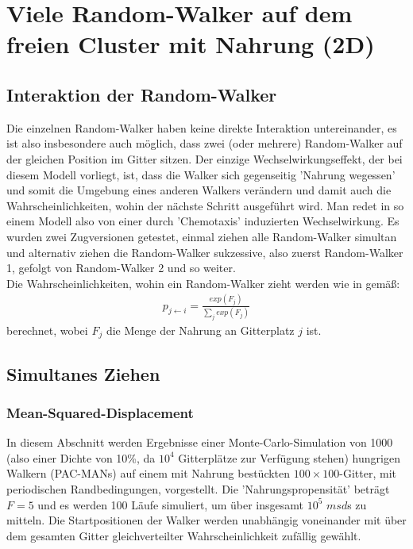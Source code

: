 \documentclass[a4paper, 12pt]{report}
\begin{document}
\chapter{Viele Random-Walker auf dem freien Cluster mit Nahrung (2D)}
\section{Interaktion der Random-Walker}
Die einzelnen Random-Walker haben keine direkte Interaktion untereinander, es ist also insbesondere auch möglich, dass zwei (oder mehrere) Random-Walker auf der gleichen Position im Gitter sitzen. Der einzige Wechselwirkungseffekt, der bei diesem Modell vorliegt, ist, dass die Walker sich gegenseitig 'Nahrung wegessen' und somit die Umgebung eines anderen Walkers verändern und damit auch die Wahrscheinlichkeiten, wohin der nächste Schritt ausgeführt wird. Man redet in so einem Modell also von einer durch 'Chemotaxis' induzierten Wechselwirkung. Es wurden zwei Zugversionen getestet, einmal ziehen alle Random-Walker simultan und alternativ ziehen die Random-Walker sukzessive, also zuerst Random-Walker 1, gefolgt von Random-Walker 2 und so weiter. \\
\noindent Die Wahrscheinlichkeiten, wohin ein Random-Walker zieht werden wie in \cite{doi:10.1063/1.4999485} gemäß:
\begin{align}
p_{j \leftarrow i} = \frac{exp({F_j})}{\sum_j exp({F_j})}
\label{Wkeiten}
\end{align}
berechnet, wobei $F_j$ die Menge der Nahrung an Gitterplatz $j$ ist.

\section{Simultanes Ziehen\label{gleichzeitig}}
\subsection{Mean-Squared-Displacement}
In diesem Abschnitt werden Ergebnisse einer Monte-Carlo-Simulation von 1000 (also einer Dichte von 10\%, da $10^4$ Gitterplätze zur Verfügung stehen) hungrigen Walkern (PAC-MANs) auf einem mit Nahrung bestückten $100 \times 100$-Gitter, mit periodischen Randbedingungen, vorgestellt. Die 'Nahrungspropensität' beträgt $F=5$ und es werden 100 Läufe simuliert, um über insgesamt $10^5$ $msd$s zu mitteln. Die Startpositionen der Walker werden unabhängig voneinander mit über dem gesamten Gitter gleichverteilter Wahrscheinlichkeit zufällig gewählt.
\end{document}
